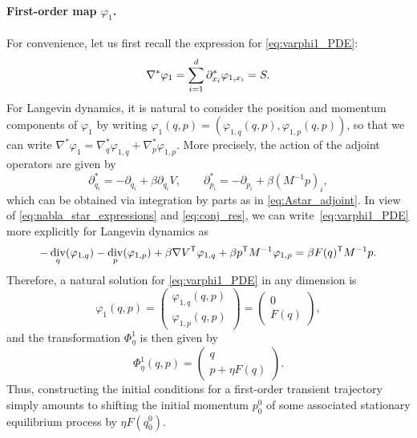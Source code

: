 \documentclass[11pt]{article}
\renewcommand{\t}{\mathsf T}
\DeclareMathOperator{\Div}{div}
\theoremstyle{definition}
\let\oldparagraph=\paragraph
\renewcommand\paragraph[1]{\oldparagraph{#1.}}
\begin{document}
\paragraph{First-order map $\varphi_1$} For convenience, let us first recall the expression for \eqref{eq:varphi1_PDE}: 
\begin{equation}
    \notag
	\nabla^*\varphi_1 = \sum_{i=1}^d \partial_{x_i}^* \varphi_{1,x_i} = S.
 \end{equation}
For Langevin dynamics, it is natural to consider the position and momentum components of $\varphi_1$ by writing $\varphi_1(q,p) = (\varphi_{1,q}(q,p), \varphi_{1,p}(q,p))$, so that we can write $\nabla^*\varphi_1 = \nabla^*_q\varphi_{1,q} + \nabla^*_p\varphi_{1,p}$. More precisely, the action of the adjoint operators are given by
\begin{equation}
	\partial^*_{q_i} = - \partial_{q_i} + \beta\partial_{q_i} V , \qquad \partial^*_{p_i} = - \partial_{p_i} + \beta (M^{-1}p)_i,
	\label{eq:nabla_star_expressions}
\end{equation}
which can be obtained via integration by parts as in \eqref{eq:Astar_adjoint}. In view of \eqref{eq:nabla_star_expressions} and \eqref{eq:conj_res}, we can write~\eqref{eq:varphi1_PDE} more explicitly for Langevin dynamics as
\begin{equation}
    \notag
	-\Div_q(\varphi_{1,q}) - \Div_p(\varphi_{1,p}) + \beta \nabla V^\t \varphi_{1,q} + \beta p^\t M^{-1} \varphi_{1,p} = \beta F(q)^\t M^{-1} p.
\end{equation}
Therefore, a natural solution for \eqref{eq:varphi1_PDE} in any dimension is
\begin{equation}
	\varphi_1(q,p) = \begin{pmatrix}
 	\varphi_{1,q}(q,p) \\ \varphi_{1,p}(q,p)
 	\end{pmatrix} =
	\begin{pmatrix}
 	0 \\ F(q)
 	\end{pmatrix},
 	\label{eq:varphi1_sol}
\end{equation}
and the transformation $\Phi^1_\eta$ is then given by
\begin{equation}
	\Phi_\eta^1(q,p) = 
	\begin{pmatrix}
 	  q \\ p + \eta F(q)
 	\end{pmatrix}.
  \label{eq:Phi1_map}
\end{equation}
Thus, constructing the initial conditions for a first-order transient trajectory simply amounts to shifting the initial momentum $p_0^0$ of some associated stationary equilibrium process by $\eta F(q_0^0)$.
\end{document}

